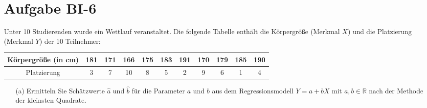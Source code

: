 
\section{Aufgabe BI-6}

\begin{task}
    Unter 10 Studierenden wurde ein Wettlauf veranstaltet. Die folgende Tabelle enthält die Körpergröße (Merkmal $X$) und die Platzierung (Merkmal $Y$) der 10 Teilnehmer:

    \begin{table}[H]
    \centering
    \begin{tabular}{c|cccccccccc}
        Körpergröße (in cm) & 181 & 171 & 166 & 175 & 183 &191 & 170 & 179 & 185 & 190 \\ \hline
        Platzierung & 3 & 7 & 10 & 8 & 5 & 2 & 9 & 6 & 1 & 4
    \end{tabular}
    \end{table}

    \begin{enumerate}
        \item[(a)] Ermitteln Sie Schätzwerte $\hat{a}$ und $\hat{b}$ für die Parameter $a$ und $b$ aus dem Regressionsmodell $Y=a+bX$ mit
        $a,b\in\mathbb{R}$
        nach der Methode der kleinsten Quadrate.
    \end{enumerate}
\end{task}


